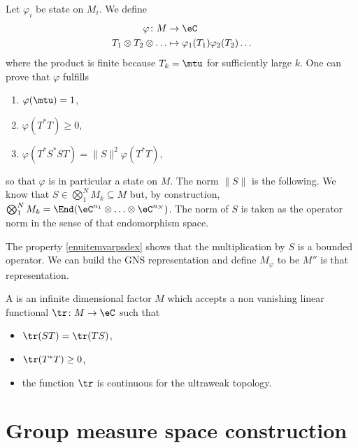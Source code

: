 Let $\varphi_i$ be state on $M_i$. We define 
\begin{equation}
\begin{aligned}
 \varphi\colon M&\to \eC \\ 
   T_1\otimes T_2\otimes\ldots&\mapsto \varphi_1(T_1)\varphi_2(T_2)\ldots 
\end{aligned}
\end{equation}
where the product is finite because $T_k=\mtu$ for sufficiently large $k$. One can prove that $\varphi$ fulfills
\begin{enumerate}
\item $\varphi(\mtu)=1$,
\item $\varphi(T^*T)\geq 0$,
\item\label{enuitemvarpsdex} $\varphi(T^*S^*ST)=\| S \|^2\varphi(T^*T)$,
\end{enumerate}
so that $\varphi$ is in particular a state on $M$. The norm $\| S \|$ is the following. We know that $S\in\bigotimes_1^NM_k\subseteq M$ but, by construction, $\bigotimes_1^NM_k=\End(\eC^{n_1}\otimes\ldots\otimes \eC^{n_N})$. The norm of $S$ is taken as the operator norm in the sense of that endomorphism space.

The property \ref{enuitemvarpsdex} shows that the multiplication by $S$ is a bounded operator. We can build the GNS representation and define $M_{\varphi}$ to be $M''$ is that representation.

\begin{definition}
A  is an infinite dimensional factor $M$ which accepts a non vanishing linear functional $\tr\colon M\to \eC$ such that
\begin{itemize}
\item $\tr(ST)=\tr(TS)$,
\item $\tr(T^*T)\geq 0$,
\item the function $\tr$ is continuous for the ultraweak topology.
\end{itemize}
\end{definition}


					\section{Group measure space construction}

